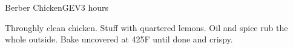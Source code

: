 \begin{recipe}{Berber Chicken}{GEV}{3 hours}
  
  Throughly clean chicken. Stuff with quartered lemons. Oil and spice rub the
  whole outside. Bake uncovered at 425\0F until done and crispy.
\end{recipe}
